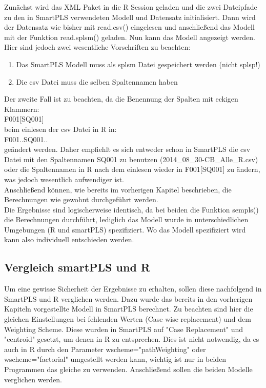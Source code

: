 \documentclass{article}\usepackage[]{graphicx}\usepackage[]{color}
\begin{document}
Zunächst wird das XML Paket in die R Session geladen und die zwei Dateipfade zu den in SmartPLS verwendeten Modell und Datensatz initialisiert. Dann wird der Datensatz wie bisher mit read.csv() eingelesen und anschließend das Modell mit der Funktion read.splsm() geladen. Nun kann das Modell angezeigt werden.\\
Hier sind jedoch zwei wesentliche Vorschriften zu beachten:
\begin{enumerate}
    \item Das SmartPLS Modell muss als splsm Datei gespeichert werden (nicht splsp!)
    \item Die csv Datei muss die selben Spaltennamen haben
\end{enumerate}
Der zweite Fall ist zu beachten, da die Benennung der Spalten mit eckigen Klammern: \\
F001[SQ001]\\
beim einlesen der csv Datei in R in:\\
F001..SQ001..\\
geändert werden. Daher empfiehlt es sich entweder schon in SmartPLS die csv Datei mit den Spaltennamen
SQ001 zu benutzen (2014\_08\_30-CB\_Alle\_R.csv) oder die Spaltennamen in R nach dem einlesen wieder in F001[SQ001] zu ändern, was jedoch wesentlich aufwendiger ist.\\
Anschließend können, wie bereits im vorherigen Kapitel beschrieben, die Berechnungen wie gewohnt durchgeführt werden.\\ Die Ergebnisse sind logischerweise identisch, da bei beiden die Funktion sempls() die Berechnungen durchführt, lediglich das Modell wurde in unterschiedlichen Umgebungen (R und smartPLS) spezifiziert. Wo das Modell spezifiziert wird kann also individuell entschieden werden.
\\

\subsection{Vergleich smartPLS und R}
Um eine gewisse Sicherheit der Ergebnisse zu erhalten, sollen diese nachfolgend in SmartPLS und R verglichen werden. Dazu wurde das bereits in den vorherigen Kapiteln vorgestellte Modell in SmartPLS berechnet. Zu beachten sind hier die gleichen Einstellungen bei fehlenden Werten (Case wise replacement) und dem Weighting Scheme. Diese wurden in SmartPLS auf "Case Replacement" und "centroid" gesetzt, um denen in R zu entsprechen. Dies ist nicht notwendig, da es auch in R durch den Parameter wscheme="pathWeighting" oder wscheme="factorial"  umgestellt werden kann, wichtig ist nur in beiden Programmen das gleiche zu verwenden. Anschließend sollen die beiden Modelle verglichen werden.
\end{document}
